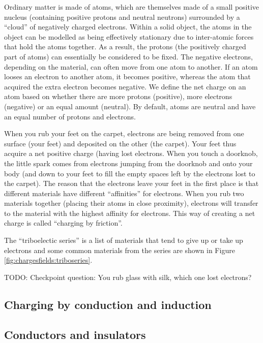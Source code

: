 Ordinary matter is made of atoms, which are themselves made of a small positive nucleus (containing positive protons and neutral neutrons) surrounded by a ``cloud'' of negatively charged electrons. Within a solid object, the atoms in the object can be modelled as being effectively stationary due to inter-atomic forces that hold the atoms together. As a result, the protons (the positively charged part of atoms) can essentially be considered to be fixed. The negative electrons, depending on the material, can often move from one atom to another. If an atom looses an electron to another atom, it becomes positive, whereas the atom that acquired the extra electron becomes negative. We define the net charge on an atom based on whether there are more protons (positive), more electrons (negative) or an equal amount (neutral). By default, atoms are neutral and have an equal number of protons and electrons.

When you rub your feet on the carpet, electrons are being removed from one surface (your feet) and deposited on the other (the carpet). Your feet thus acquire a net positive charge (having lost electrons. When you touch a doorknob, the little spark comes from electrons jumping from the doorknob and onto your body (and down to your feet to fill the empty spaces left by the electrons lost to the carpet). The reason that the electrons leave your feet in the first place is that different materials have different ``affinities'' for electrons. When you rub two materials together (placing their atoms in close proximity), electrons will transfer to the material with the highest affinity for electrons. This way of creating a net charge is called ``charging by friction''. 

The ``triboelectic series'' is a list of materials that tend to give up or take up electrons and some common materials from the series are shown in Figure \ref{fig:chargesfields:triboseries}.


TODO: Checkpoint question: You rub glass with silk, which one lost electrons?


\subsection{Charging by conduction and induction}
\subsection{Conductors and insulators}

